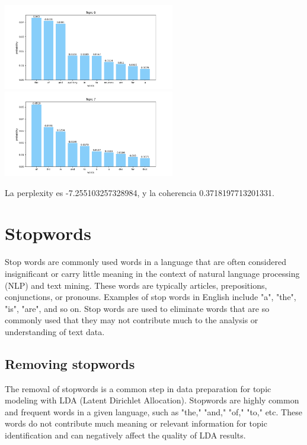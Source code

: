 \documentclass[10pt]{article} %
\begin{document}
\begin{center}
		\includegraphics[width=7.5cm]{images/plots/test_8/topic_6.png}
		\includegraphics[width=7.5cm]{images/plots/test_8/topic_7.png}
	\end{center}

		
	La perplexity es -7.255103257328984, y la coherencia  0.3718197713201331.
	
	\section{Stopwords}
	Stop words are commonly used words in a language that are often considered insignificant or carry little meaning in the context of natural language processing (NLP) and text mining. These words are typically articles, prepositions, conjunctions, or pronouns. Examples of stop words in English include "a", "the", "is", "are", and so on. Stop words are used to eliminate words that are so commonly used that they may not contribute much to the analysis or understanding of text data.
	
	\subsection{Removing stopwords}
	
	The removal of stopwords is a common step in data preparation for topic modeling with LDA (Latent Dirichlet Allocation). Stopwords are highly common and frequent words in a given language, such as "the," "and," "of," "to," etc. These words do not contribute much meaning or relevant information for topic identification and can negatively affect the quality of LDA results.
	
\end{document}
